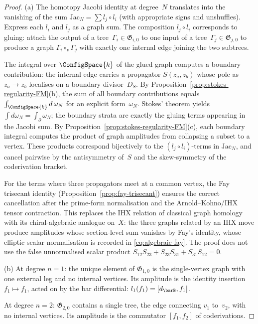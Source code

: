 \begin{proof}
(a)\enspace
The homotopy Jacobi identity at degree~$N$ translates into the
vanishing of the sum
$\mathrm{Jac}_N = \sum l_j \circ l_i$
(with appropriate signs and unshuffles).
Express each $l_i$ and $l_j$ as a graph sum. The composition
$l_j \circ l_i$ corresponds to gluing: attach the output of a
tree~$\Gamma_i \in \mathfrak{G}_{i,0}$ to one input of a
tree~$\Gamma_j \in \mathfrak{G}_{j,0}$ to produce a graph
$\Gamma_i \circ_v \Gamma_j$ with exactly one internal edge
joining the two subtrees.

The integral over $\ConfigSpace{k}$ of the
glued graph computes a boundary contribution: the internal edge
carries a propagator $S(z_a, z_b)$ whose pole as
$z_a \to z_b$ localises on a boundary divisor~$D_S$.
By Proposition~\ref{prop:stokes-regularity-FM}(b), the sum of
all boundary contributions equals
$\int_{\ConfigSpace{k}} d\,\omega_N$ for an explicit
form~$\omega_N$. Stokes' theorem yields
$\int d\omega_N = \int_\partial \omega_N$; the boundary strata
are exactly the gluing terms appearing in the Jacobi sum.
By Proposition~\ref{prop:stokes-regularity-FM}(c), each boundary
integral computes the product of graph amplitudes from collapsing
a subset to a vertex. These products correspond bijectively to the
$(l_j \circ l_i)$-terms in $\mathrm{Jac}_N$, and cancel pairwise
by the antisymmetry of~$S$ and the skew-symmetry of the coderivation
bracket.

For the terms where three propagators meet at a common vertex, the
Fay trisecant identity
(Proposition~\ref{prop:fay-trisecant}) ensures the correct
cancellation after the prime-form normalisation and the
Arnold--Kohno/IHX tensor contraction. This replaces the IHX
relation of classical graph homology~\cite{LV12} with its
chiral-algebraic analogue on~$X$: the three graphs related by an
IHX move produce amplitudes whose section-level sum vanishes by
Fay's identity, whose elliptic scalar normalisation is recorded in
\eqref{eq:algebraic-fay}. The proof does not use the false
unnormalised scalar product
$S_{12}S_{23}+S_{23}S_{31}+S_{31}S_{12}=0$.

(b)\enspace
At degree $n = 1$: the unique element of $\mathfrak{G}_{1,0}$ is the
single-vertex graph with one external leg and no internal vertices.
Its amplitude is the identity insertion $f_1 \mapsto f_1$, acted on
by the bar differential: $l_1(f_1) = [d_{\barB}, f_1]$.

At degree $n = 2$: $\mathfrak{G}_{2,0}$ contains a single tree, the
edge connecting $v_1$ to~$v_2$, with no internal vertices. Its
amplitude is the commutator $[f_1, f_2]$ of coderivations.


\end{proof}

